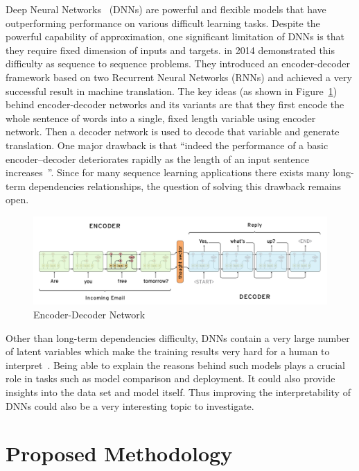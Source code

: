 \documentclass{article} \usepackage{tabularx}
\renewcommand{\citename}{\citet} \renewcommand{\cite}{\citep}
\begin{document}
Deep Neural Networks~\cite{goodfellow2016deep} (DNNs) are
powerful and flexible models that have outperforming performance
on various difficult learning tasks. Despite the powerful
capability of approximation, one significant limitation of DNNs
is that they require fixed dimension of inputs and targets.
\citename{sutskever2014sequence} in 2014 demonstrated this
difficulty as sequence to sequence problems. They introduced an
encoder-decoder framework based on two Recurrent Neural Networks
(RNNs) and achieved a very successful result in machine
translation. The key ideas (as shown in Figure~\ref{fig:en-de})
behind encoder-decoder networks and its variants are that they
first encode the whole sentence of words into a single, fixed
length variable using encoder network. Then a decoder network is
used to decode that variable and generate translation. One major
drawback is that ``indeed the performance of a basic
encoder–decoder deteriorates rapidly as the length of an input
sentence increases~\cite{attention}''. Since for many sequence
learning applications there exists many long-term dependencies
relationships, the question of solving this drawback remains
open.

\begin{figure}
  \centering
  \includegraphics[scale=0.5]{images/en-de.png}
  \caption{Encoder-Decoder Network}
  \label{fig:en-de}
\end{figure}

Other than long-term dependencies difficulty, DNNs contain a very
large number of latent variables which make the training results
very hard for a human to interpret~\cite{goodfellow2016deep}.
Being able to explain the reasons behind such models plays a
crucial role in tasks such as model comparison and deployment. It
could also provide insights into the data set and model itself.
Thus improving the interpretability of DNNs could also be a very
interesting topic to investigate.


\section{Proposed Methodology}
\label{sec:method}
\end{document}

